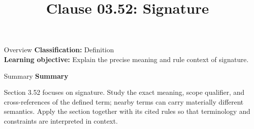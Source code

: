 \documentclass[10pt,letterpaper]{article}
\title{Clause 03.52: Signature}
\author{}
\date{}
\begin{document}
\maketitle
\begin{CornellOverviewBox}{Overview}
\textbf{Classification:} Definition\\[2pt]
\textbf{Learning objective:} Explain the precise meaning and rule context of signature.
\end{CornellOverviewBox}\begin{CornellSummaryBox}{Summary}
{\sffamily\bfseries\color{Accent} Summary}\par\vspace{3pt}Section 3.52 focuses on signature. Study the exact meaning, scope qualifier, and cross-references of the defined term; nearby terms can carry materially different semantics. Apply the section together with its cited rules so that terminology and constraints are interpreted in context.
\end{CornellSummaryBox}
\end{document}
